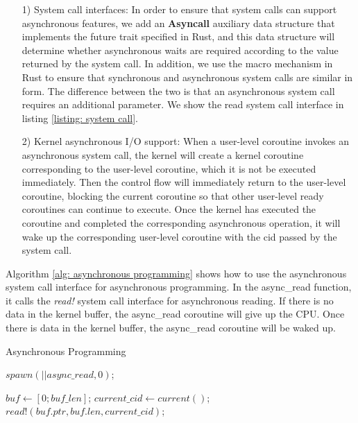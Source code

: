 \documentclass[sigconf,review,anonymous]{acmart}
\begin{document}
\begin{itemize}[leftmargin=*]
  \item[1)] System call interfaces: In order to ensure that system calls can support asynchronous features, we add an \textbf{Asyncall} auxiliary data structure that implements the future trait specified in Rust, and this data structure will determine whether asynchronous waits are required according to the value returned by the system call. In addition, we use the macro mechanism in Rust to ensure that synchronous and asynchronous system calls are similar in form. The difference between the two is that an asynchronous system call requires an additional parameter. We show the read system call interface in listing \ref{listing: system call}.
  \item[2)] Kernel asynchronous I/O support: When a user-level coroutine invokes an asynchronous system call, the kernel will create a kernel coroutine corresponding to the user-level coroutine, which it is not be executed immediately. Then the control flow will immediately return to the user-level coroutine, blocking the current coroutine so that other user-level ready coroutines can continue to execute. Once the kernel has executed the coroutine and completed the corresponding asynchronous operation, it will wake up the corresponding user-level coroutine with the cid passed by the system call. 
\end{itemize}

Algorithm \ref{alg: asynchronous programming} shows how to use the asynchronous system call interface for asynchronous programming. In the async\_read function, it calls the \textit{read!} system call interface for asynchronous reading. If there is no data in the kernel buffer, the async\_read coroutine will give up the CPU. Once there is data in the kernel buffer, the async\_read coroutine will be waked up.

\begin{algorithm}[!h]
  \caption{Asynchronous Programming}
  \label{alg: asynchronous programming}
  \begin{algorithmic}[1]
      \State $spawn(|| async\_read, 0)$;
		\EndFunction

      \State $buf \gets [0; buf\_len]$;
      \State $current\_cid \gets current()$;
      \State $read!(buf.ptr, buf.len, current\_cid)$;
    \EndFunction
  \end{algorithmic}
\end{algorithm}
\end{document}
